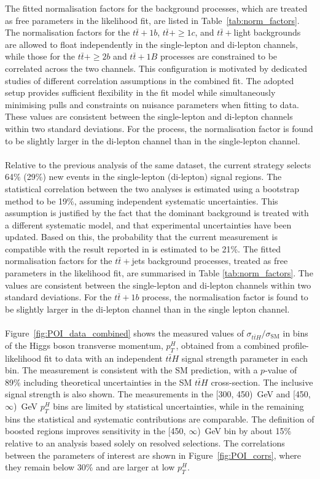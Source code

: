 The fitted normalisation factors for the \ttjets background processes, which are treated as free parameters in the likelihood fit, are listed in Table~\ref{tab:norm_factors}. The normalisation factors for the $t\bar{t}+1b$, $t\bar{t}+\geq 1c$, and $t\bar{t}+$light backgrounds are allowed to float independently in the single-lepton and di-lepton channels, while those for the $t\bar{t}+\geq 2b$ and $t\bar{t}+1B$ processes are constrained to be correlated across the two channels. This configuration is motivated by dedicated studies of different correlation assumptions in the combined fit. The adopted setup provides sufficient flexibility in the fit model while simultaneously minimising pulls and constraints on nuisance parameters when fitting to data. These values are consistent between the single-lepton and di-lepton channels within two standard deviations. For the \ttb process, the normalisation factor is found to be slightly larger in the di-lepton channel than in the single-lepton channel.\\
\\
Relative to the previous analysis of the same dataset, the current strategy selects 64\% (29\%) new events in the single-lepton (di-lepton) signal regions. The statistical correlation between the two analyses is estimated using a bootstrap method to be 19\%, assuming independent systematic uncertainties. This assumption is justified by the fact that the dominant \ttbin background is treated with a different systematic model, and that experimental uncertainties have been updated. Based on this, the probability that the current measurement is compatible with the result reported in \cite{tth-atlas-2018} is estimated to be 21\%. The fitted normalisation factors for the $t\bar{t}+$jets background processes, treated as free parameters in the likelihood fit, are summarised in Table \ref{tab:norm_factors}. The values are consistent between the single-lepton and di-lepton channels within two standard deviations.  For the $t\bar{t}+1b$ process, the normalisation factor is found to be slightly larger in the di-lepton channel than in the single lepton channel.\\
\\
Figure~\ref{fig:POI_data_combined} shows the measured values of $\sigma_{t\bar{t}H}/\sigma_\text{SM}$ in bins of the Higgs boson transverse momentum, $p_{T}^{H}$, obtained from a combined profile-likelihood fit to data with an independent $t\bar{t}H$ signal strength parameter in each bin. The measurement is consistent with the SM prediction, with a $p$-value of 89\% including theoretical uncertainties in the SM $t\bar{t}H$ cross-section. The inclusive signal strength is also shown. The measurements in the [300, 450)~GeV and [450, $\infty$)~GeV $p_{T}^{H}$ bins are limited by statistical uncertainties, while in the remaining bins the statistical and systematic contributions are comparable.  The definition of boosted regions improves sensitivity in the [450, $\infty$)~GeV bin by about 15\% relative to an analysis based solely on resolved selections. The correlations between the parameters of interest are shown in Figure~\ref{fig:POI_corrs}, where they remain below 30\% and are larger at low $p_{T}^{H}$.
